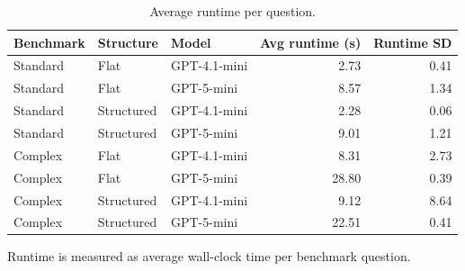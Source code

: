 \begin{table}[htbp]
\centering
\small
\caption{Average runtime per question.}
\label{tab:average-runtime}
\begin{tabular}{lllrr}
\toprule
Benchmark & Structure & Model & Avg runtime (s) & Runtime SD \\
\midrule
Standard & Flat & GPT-4.1-mini & 2.73 & 0.41 \\
Standard & Flat & GPT-5-mini & 8.57 & 1.34 \\
Standard & Structured & GPT-4.1-mini & 2.28 & 0.06 \\
Standard & Structured & GPT-5-mini & 9.01 & 1.21 \\
Complex & Flat & GPT-4.1-mini & 8.31 & 2.73 \\
Complex & Flat & GPT-5-mini & 28.80 & 0.39 \\
Complex & Structured & GPT-4.1-mini & 9.12 & 8.64 \\
Complex & Structured & GPT-5-mini & 22.51 & 0.41 \\
\bottomrule
\end{tabular}
\par\footnotesize{Runtime is measured as average wall-clock time per benchmark question.}
\end{table}
